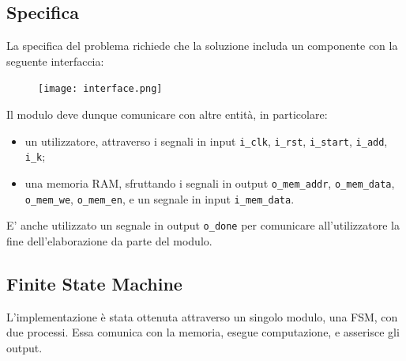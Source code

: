 \documentclass{article}
\begin{document}
\subsection{Specifica}
La specifica del problema richiede che la soluzione includa un componente con la seguente interfaccia:

\begin{figure}[h]
    \centering
    \texttt{[image: interface.png]}
\end{figure}

Il modulo deve dunque comunicare con altre entità, in particolare:
\begin{itemize}[label=\raisebox{0.25ex}{\tiny$\bullet$}]
    \item un utilizzatore, attraverso i segnali in input \texttt{i\_clk}, \texttt{i\_rst}, \texttt{i\_start}, \texttt{i\_add}, \texttt{i\_k};
    \item una memoria RAM, sfruttando i segnali in output \texttt{o\_mem\_addr}, \texttt{o\_mem\_data}, \texttt{o\_mem\_we}, \texttt{o\_mem\_en}, e un segnale in input \texttt{i\_mem\_data}.
\end{itemize}
E' anche utilizzato un segnale in output \texttt{o\_done} per comunicare all'utilizzatore la fine dell'ela\-borazione da parte del modulo.

\subsection{Finite State Machine}
L'implementazione è stata ottenuta attraverso un singolo modulo, una FSM, con due processi.
Essa comunica con la memoria, esegue computazione, e asserisce gli output.
\end{document}
